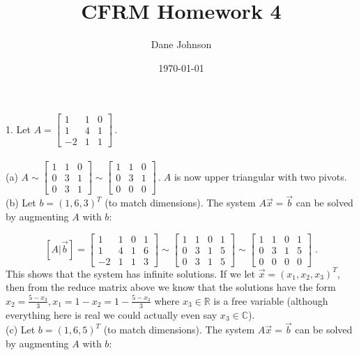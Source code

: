 \documentclass[11pt]{article}
\begin{document}
\title{CFRM Homework 4}
\author{Dane Johnson}
\date{\today}
\maketitle

1. Let $A = \begin{bmatrix}
1 & 1 & 0 \\ 1 & 4 & 1 \\ -2 & 1 & 1
\end{bmatrix} \,. $ \\\\

(a) $ A
\sim \begin{bmatrix}
1 & 1 & 0 \\ 0 & 3 & 1 \\ 0 & 3 & 1
\end{bmatrix}
\sim \begin{bmatrix}
1 & 1 & 0 \\ 0 & 3 & 1 \\ 0 & 0 & 0
\end{bmatrix} \,.\; A
$ is now upper triangular with two pivots. \\

(b) Let $ b = (1,6,3)^T $ (to match dimensions). The system $A\vec{x} = \vec{b}$ can be solved by augmenting $A$ with $b$:

$$
[A|\vec{b}] = \begin{bmatrix}
1 & 1 & 0 & 1 \\ 1 & 4 & 1 & 6 \\ -2 & 1 & 1 & 3
\end{bmatrix}
\sim \begin{bmatrix}
1 & 1 & 0 & 1 \\ 0 & 3 & 1 & 5 \\ 0 & 3 & 1 & 5
\end{bmatrix}
\sim \begin{bmatrix}
1 & 1 & 0 & 1 \\ 0 & 3 & 1 & 5 \\ 0&0&0&0
\end{bmatrix} \;.
$$
This shows that the system has infinite solutions. If we let $\vec{x} = (x_1, x_2, x_3)^T$, then from the reduce matrix above we know that the solutions have the form $x_2 = \frac{5-x_3}{3}, x_1 = 1- x_2 = 1 - \frac{5-x_3}{3}$ where $x_3 \in \mathbb{R}$ is a free variable (although everything here is real we could actually even say $x_3 \in \mathbb{C}$).\\

(c) Let $ b = (1,6,5)^T $ (to match dimensions). The system $A\vec{x} = \vec{b}$ can be solved by augmenting $A$ with $b$:
\end{document}
